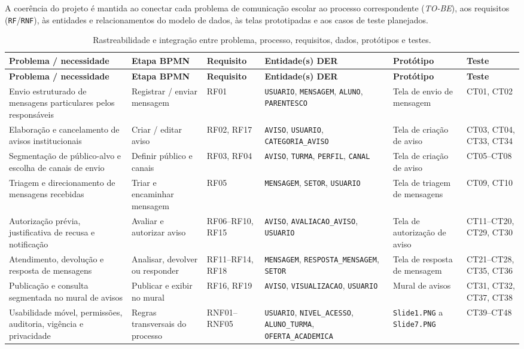 \documentclass[a4paper,12pt]{report}
\begin{document}
A coerência do projeto é mantida ao conectar cada problema de comunicação escolar ao processo correspondente (\textit{TO-BE}), aos requisitos (\texttt{RF}/\texttt{RNF}), às entidades e relacionamentos do modelo de dados, às telas prototipadas e aos casos de teste planejados.

\begin{longtable}{|p{2.5cm}|p{2.3cm}|p{1.9cm}|p{2.5cm}|p{2.3cm}|p{2.1cm}|}
\caption{Rastreabilidade e integração entre problema, processo, requisitos, dados, protótipos e testes.} \label{tab:integracao-artefatos} \\
\hline
\textbf{Problema / necessidade} & \textbf{Etapa BPMN} & \textbf{Requisito} & \textbf{Entidade(s) DER} & \textbf{Protótipo} & \textbf{Teste} \\
\hline
\endfirsthead
\hline
\textbf{Problema / necessidade} & \textbf{Etapa BPMN} & \textbf{Requisito} & \textbf{Entidade(s) DER} & \textbf{Protótipo} & \textbf{Teste} \\
\hline
\endhead
Envio estruturado de mensagens particulares pelos responsáveis & Registrar / enviar mensagem & RF01 & \texttt{USUARIO}, \texttt{MENSAGEM}, \texttt{ALUNO}, \texttt{PARENTESCO} & Tela de envio de mensagem & CT01, CT02 \\
\hline
Elaboração e cancelamento de avisos institucionais & Criar / editar aviso & RF02, RF17 & \texttt{AVISO}, \texttt{USUARIO}, \texttt{CATEGORIA\_AVISO} & Tela de criação de aviso & CT03, CT04, CT33, CT34 \\
\hline
Segmentação de público-alvo e escolha de canais de envio & Definir público e canais & RF03, RF04 & \texttt{AVISO}, \texttt{TURMA}, \texttt{PERFIL}, \texttt{CANAL} & Tela de criação de aviso & CT05--CT08 \\
\hline
Triagem e direcionamento de mensagens recebidas & Triar e encaminhar mensagem & RF05 & \texttt{MENSAGEM}, \texttt{SETOR}, \texttt{USUARIO} & Tela de triagem de mensagens & CT09, CT10 \\
\hline
Autorização prévia, justificativa de recusa e notificação & Avaliar e autorizar aviso & RF06--RF10, RF15 & \texttt{AVISO}, \texttt{AVALIACAO\_AVISO}, \texttt{USUARIO} & Tela de autorização de aviso & CT11--CT20, CT29, CT30 \\
\hline
Atendimento, devolução e resposta de mensagens & Analisar, devolver ou responder & RF11--RF14, RF18 & \texttt{MENSAGEM}, \texttt{RESPOSTA\_MENSAGEM}, \texttt{SETOR} & Tela de resposta de mensagem & CT21--CT28, CT35, CT36 \\
\hline
Publicação e consulta segmentada no mural de avisos & Publicar e exibir no mural & RF16, RF19 & \texttt{AVISO}, \texttt{VISUALIZACAO}, \texttt{USUARIO} & Mural de avisos & CT31, CT32, CT37, CT38 \\
\hline
Usabilidade móvel, permissões, auditoria, vigência e privacidade & Regras transversais do processo & RNF01--RNF05 & \texttt{USUARIO}, \texttt{NIVEL\_ACESSO}, \texttt{ALUNO\_TURMA}, \texttt{OFERTA\_ACADEMICA} & \texttt{Slide1.PNG} a \texttt{Slide7.PNG} & CT39--CT48 \\
\hline
\end{longtable}
\end{document}
